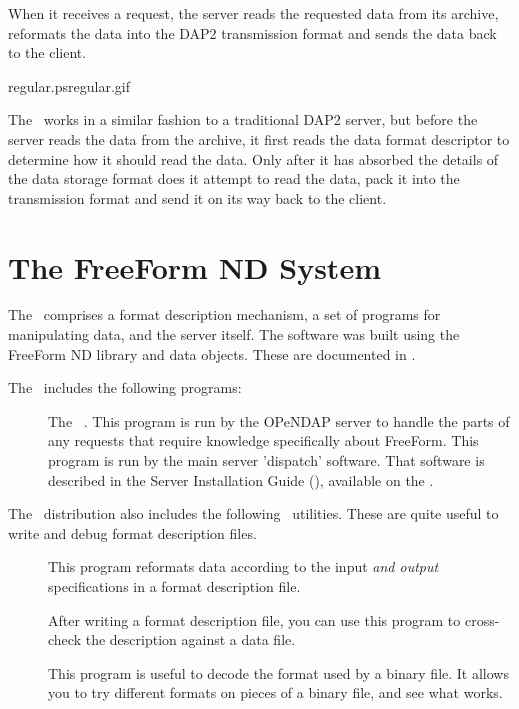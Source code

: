 When it receives a request, the server reads the requested data from
its archive, reformats the data into the DAP2 transmission format and
sends the data back to the client.

{regular.ps}{regular.gif}{}

The \ffs\ works in a similar fashion to a traditional DAP2 server, but
before the server reads the data from the archive, it first reads the
data format descriptor to determine how it should read the data.  Only
after it has absorbed the details of the data storage format does it
attempt to read the data, pack it into the transmission format and
send it on its way back to the client.


\section{The FreeForm ND System}

The \ffs\ comprises a format description mechanism, a set of programs
for manipulating data, and the server itself.  The software was built
using the FreeForm ND library and data objects.  These are documented
in \ffbook .

The \ffs\ includes the following programs:

\begin{description}
\item[] The \ffs\ . This program
  is run by the OPeNDAP server to handle the parts of any requests
  that require knowledge specifically about FreeForm. This program is
  run by the main server 'dispatch' software. That software is
  described in the Server Installation Guide (\OPDinstallUrl),
  available on the \DODShome .
\end{description}

The \ffs\ distribution also includes the following \ffnd\ utilities.
These are quite useful to write and debug format description files.

\begin{description}
\item[] This program reformats data according to the
  input \emph{and output} specifications in a format description file.

\item[] After writing a format description file, you can
  use this program to cross-check the description against a data file.

\item[] This program is useful to decode the format used
  by a binary file.  It allows you to try different formats on pieces
  of a binary file, and see what works.
\end{description}


